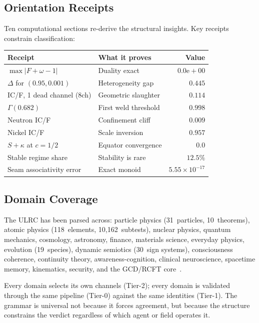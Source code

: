 \documentclass[
  aps,
  prd,
  twocolumn,
  superscriptaddress,
  nofootinbib,
  floatfix
]{revtex4-2}
\newcommand{\Gam}{\Gamma}
\newcommand{\Fid}{F}
\newcommand{\Drft}{\omega}
\newcommand{\Ent}{S}
\newcommand{\Logint}{\kappa}
\begin{document}
\subsection{Orientation Receipts}

Ten computational sections re-derive the structural insights.
Key receipts constrain classification:

\begin{center}
\footnotesize
\begin{tabular}{@{}llr@{}}
\toprule
\textbf{Receipt} & \textbf{What it proves} & \textbf{Value} \\
\midrule
$\max|\Fid{+}\Drft{-}1|$ & Duality exact &
  $0.0\mathrm{e}{+}00$ \\
$\Delta$ for $(0.95, 0.001)$ & Heterogeneity gap &
  $0.445$ \\
IC/F, 1 dead channel (8ch) & Geometric slaughter &
  $0.114$ \\
$\Gam(0.682)$ & First weld threshold &
  $0.998$ \\
Neutron IC/F & Confinement cliff &
  $0.009$ \\
Nickel IC/F & Scale inversion &
  $0.957$ \\
$\Ent + \Logint$ at $c=1/2$ & Equator convergence &
  $0.0$ \\
Stable regime share & Stability is rare &
  $12.5\%$ \\
Seam associativity error & Exact monoid &
  $5.55 \times 10^{-17}$ \\
\bottomrule
\end{tabular}
\end{center}

\subsection{Domain Coverage}

The ULRC has been parsed across: particle physics (31~particles,
10~theorems), atomic physics (118~elements, 10,162~subtests),
nuclear physics, quantum mechanics, cosmology, astronomy,
finance, materials science, everyday physics, evolution
(19~species), dynamic semiotics (30~sign systems), consciousness
coherence, continuity theory, awareness-cognition,
clinical neuroscience, spacetime memory, kinematics, security,
and the GCD/RCFT core~\cite{paulus2025umcp}.

Every domain selects its own channels (Tier-2); every domain is
validated through the same pipeline (Tier-0) against the same
identities (Tier-1). The grammar is universal not because it
forces agreement, but because the structure constrains the
verdict regardless of which agent or field operates it.
\end{document}
